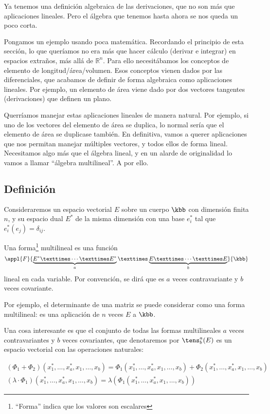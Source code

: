 Ya tenemos una definición algebraica de las derivaciones, que no son más que aplicaciones lineales. Pero el álgebra que tenemos hasta ahora se nos queda un poco corta.

Pongamos un ejemplo usando poca matemática. Recordando el principio de esta sección, lo que queríamos no era más que hacer cálculo (derivar e integrar) en espacios extraños, más allá de $ℝ^n$. Para ello necesitábamos los conceptos de elemento de longitud/área/volumen. Esos conceptos vienen dados por las diferenciales, que acabamos de definir de forma algebraica como aplicaciones lineales. Por ejemplo, un elemento de área viene dado por dos vectores tangentes (derivaciones) que definen un plano.

Querríamos manejar estas aplicaciones lineales de manera natural. Por ejemplo, si uno de los vectores del elemento de área se duplica, lo normal sería que el elemento de área se duplicase también. En definitiva, vamos a querer aplicaciones que nos permitan manejar múltiples vectores, y todos ellos de forma lineal. Necesitamos algo más que el álgebra lineal, y en un alarde de originalidad lo vamos a llamar ``álgebra multilineal''. A por ello.

\subsection{Definición}

Consideraremos un espacio vectorial $E$ sobre un cuerpo $\kbb$ con dimensión finita $n$, y su espacio dual $E^*$ de la misma dimensión con una base $e^*_i$ tal que $e_i^*(e_j) = δ_{ij}$.

\begin{defn} Una forma\footnote{``Forma'' indica que los valores son escalares} multilineal es una función \[
\appl{F}{\underbrace{E^* × \dotsb × E^*}_{a} × \underbrace{E × \dotsb × E}_{b}}{\kbb} \] lineal en cada variable. Por convención, se dirá que es $a$ veces contravariante y $b$ veces covariante.
\end{defn}

Por ejemplo, el determinante de una matriz se puede considerar como una forma multilineal: es una aplicación de $n$ veces $E$ a $\kbb$.

Una cosa interesante es que el conjunto de todas las formas multilineales $a$ veces contravariantes y $b$ veces covariantes, que denotaremos por $\tens_b^a(E)$ es un espacio vectorial con las operaciones naturales:

\begin{gather*}
(Φ_1 + Φ_2)(x_1^*,\dotsc, x_a^*, x_1, \dotsc, x_b) = Φ_1(x_1^*,\dotsc, x_a^*, x_1, \dotsc, x_b) + Φ_2(x_1^*,\dotsc, x_a^*, x_1, \dotsc, x_b) \\
(λ ·Φ_1)(x_1^*,\dotsc, x_a^*, x_1, \dotsc, x_b) = λ (Φ_1(x_1^*,\dotsc, x_a^*, x_1, \dotsc, x_b))
\end{gather*}

